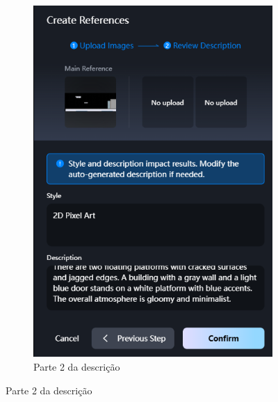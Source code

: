 \begin{figure}[htbp]
\begin{subfigure}{0.4\linewidth}
        \includegraphics[width=1\linewidth]{figs/vidu/tela_referencia_tutorial_2.PNG}
        \caption{\small Parte 2 da descrição}
        \label{fig:viduReferenciaTutorial2}
    \end{subfigure}
\end{figure}


